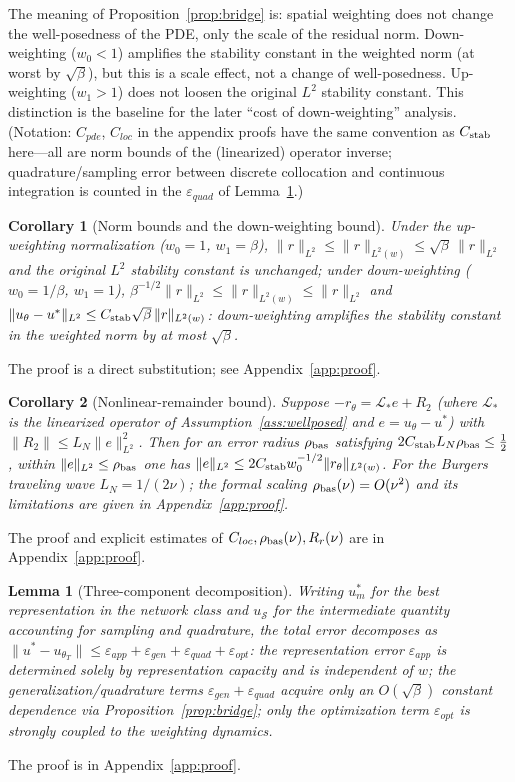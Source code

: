 \documentclass[11pt]{article}
\newcommand{\Lop}{\mathcal L}
\newtheorem{lemma}{Lemma}[section]
\newtheorem{corollary}{Corollary}[section]
\numberwithin{equation}{section}
\begin{document}
The meaning of Proposition~\ref{prop:bridge} is: spatial weighting does not change the well-posedness of the PDE, only the scale of the residual norm. Down-weighting ($w_0<1$) amplifies the stability constant in the weighted norm (at worst by $\sqrt{\beta}$), but this is a scale effect, not a change of well-posedness. Up-weighting ($w_1>1$) does not loosen the original $L^2$ stability constant. This distinction is the baseline for the later ``cost of down-weighting'' analysis. (Notation: $C_{pde}$, $C_{loc}$ in the appendix proofs have the same convention as $C_{\rm stab}$ here---all are norm bounds of the (linearized) operator inverse; quadrature/sampling error between discrete collocation and continuous integration is counted in the $\varepsilon_{quad}$ of Lemma~\ref{lem:3comp}.)

\begin{corollary}[Norm bounds and the down-weighting bound]\label{cor:normbd}
Under the up-weighting normalization ($w_0=1$, $w_1=\beta$), $\|r\|_{L^2}\le\|r\|_{L^2(w)}\le\sqrt\beta\,\|r\|_{L^2}$ and the original $L^2$ stability constant is unchanged; under down-weighting ($w_0=1/\beta$, $w_1=1$), $\beta^{-1/2}\|r\|_{L^2}\le\|r\|_{L^2(w)}\le\|r\|_{L^2}$ and $\|u_\theta-u^*\|_{L^2}\le C_{\rm stab}\sqrt\beta\,\|r\|_{L^2(w)}$: down-weighting amplifies the stability constant in the weighted norm by at most $\sqrt\beta$.
\end{corollary}
The proof is a direct substitution; see Appendix~\ref{app:proof}.

\begin{corollary}[Nonlinear-remainder bound]\label{cor:nonlin}
Suppose $-r_\theta=\Lop_*e+R_2$ (where $\Lop_*$ is the linearized operator of Assumption~\ref{ass:wellposed} and $e=u_\theta-u^*$) with $\|R_2\|\le L_N\|e\|_{L^2}^2$. Then for an error radius $\rho_{\rm bas}$ satisfying $2C_{\rm stab}L_N\rho_{\rm bas}\le\tfrac12$, within $\|e\|_{L^2}\le\rho_{\rm bas}$ one has $\|e\|_{L^2}\le 2C_{\rm stab}w_0^{-1/2}\|r_\theta\|_{L^2(w)}$. For the Burgers traveling wave $L_N=1/(2\nu)$; the formal scaling $\rho_{\rm bas}(\nu)=O(\nu^2)$ and its limitations are given in Appendix~\ref{app:proof}.
\end{corollary}
The proof and explicit estimates of $C_{loc},\rho_{\rm bas}(\nu),R_r(\nu)$ are in Appendix~\ref{app:proof}.

\begin{lemma}[Three-component decomposition]\label{lem:3comp}
Writing $u_m^*$ for the best representation in the network class and $u_{\mathcal S}$ for the intermediate quantity accounting for sampling and quadrature, the total error decomposes as $\|u^*-u_{\theta_T}\|\le\varepsilon_{app}+\varepsilon_{gen}+\varepsilon_{quad}+\varepsilon_{opt}$: the representation error $\varepsilon_{app}$ is determined solely by representation capacity and is independent of $w$; the generalization/quadrature terms $\varepsilon_{gen}+\varepsilon_{quad}$ acquire only an $O(\sqrt\beta)$ constant dependence via Proposition~\ref{prop:bridge}; only the optimization term $\varepsilon_{opt}$ is strongly coupled to the weighting dynamics.
\end{lemma}
The proof is in Appendix~\ref{app:proof}.
\end{document}
